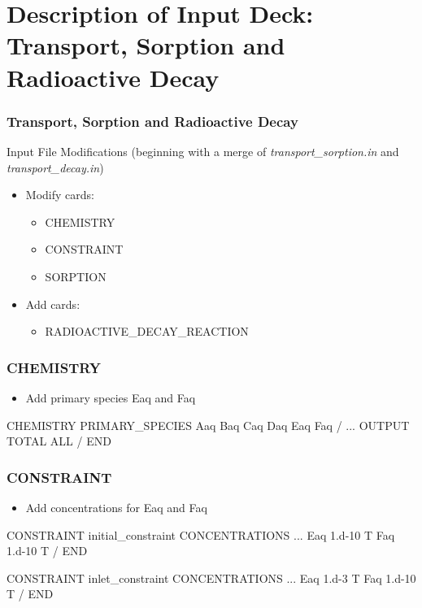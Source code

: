 \documentclass{beamer}
\newcommand\magentacomment[1]{{{\color{magenta} #1}}}
\begin{document}
\section{Description of Input Deck: Transport, Sorption and Radioactive Decay}

\begin{frame}[fragile]\frametitle{Transport, Sorption and Radioactive Decay}

Input File Modifications (beginning with a merge of \textit{transport\_sorption.in} and \textit{transport\_decay.in})
\begin{itemize}
\item Modify cards:
  \begin{itemize}
    \item CHEMISTRY
    \item CONSTRAINT
    \item SORPTION
   \end{itemize}
\item Add cards:
  \begin{itemize}
    \item RADIOACTIVE\_DECAY\_REACTION
  \end{itemize}
\end{itemize}

\end{frame}

\begin{frame}[fragile]\frametitle{CHEMISTRY}

\begin{itemize}
  \item Add primary species Eaq and Faq
\end{itemize}

\begin{semiverbatim}
CHEMISTRY
  PRIMARY_SPECIES
    Aaq
    Baq
    Caq
    Daq
    \magentacomment{Eaq}
    \magentacomment{Faq}
  /
  ...
  OUTPUT
    TOTAL
    ALL
  /
END
\end{semiverbatim}

\end{frame}

\begin{frame}[fragile]\frametitle{CONSTRAINT}

\begin{itemize}
  \item Add concentrations for Eaq and Faq
\end{itemize}

\begin{semiverbatim}
CONSTRAINT initial_constraint
  CONCENTRATIONS
    ...
    \magentacomment{Eaq   1.d-10   T}
    \magentacomment{Faq   1.d-10   T}
  /
END

CONSTRAINT inlet_constraint
  CONCENTRATIONS
    ...
    \magentacomment{Eaq   1.d-3    T}
    \magentacomment{Faq   1.d-10   T}
  /
END
\end{semiverbatim}

\end{frame}
\end{document}
